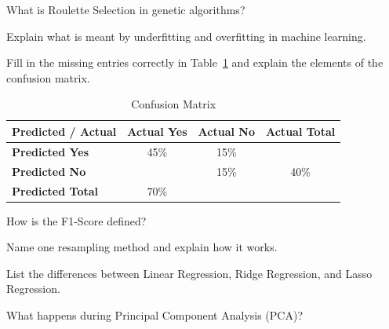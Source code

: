\documentclass[12pt]{article}
\begin{document}
    \begin{ejercicio}
        What is Roulette Selection in genetic algorithms?
    \end{ejercicio}

    \begin{ejercicio}
        Explain what is meant by underfitting and overfitting in machine learning.
    \end{ejercicio}

    \begin{ejercicio}
        Fill in the missing entries correctly in Table~\ref{tab:confusion_matrix} and explain the elements of the confusion matrix.

        \begin{table}[h!]
        \centering
        \begin{tabular}{|l|c|c|c|}
        \hline
        \textbf{Predicted / Actual} & \textbf{Actual Yes} & \textbf{Actual No} & \textbf{Actual Total} \\ \hline
        \textbf{Predicted Yes} & 45\% & 15\% & \\ \hline
        \textbf{Predicted No} & & 15\% & 40\% \\ \hline
        \textbf{Predicted Total} & 70\% & & \\ \hline
        \end{tabular}
        \caption{Confusion Matrix}
        \label{tab:confusion_matrix}
        \end{table}
    \end{ejercicio}

    \begin{ejercicio}
        How is the F1-Score defined?
    \end{ejercicio}

    \begin{ejercicio}
        Name one resampling method and explain how it works.
    \end{ejercicio}

    \begin{ejercicio}
        List the differences between Linear Regression, Ridge Regression, and Lasso Regression.
    \end{ejercicio}

    \begin{ejercicio}
        What happens during Principal Component Analysis (PCA)?
    \end{ejercicio}
\end{document}
